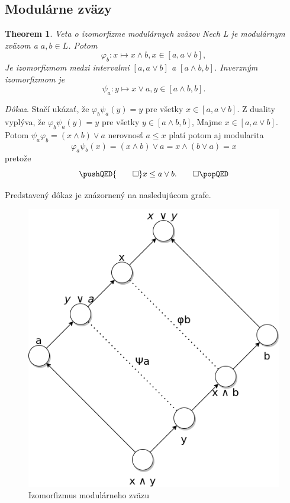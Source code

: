 \documentclass[a4paper,10pt,oneside]{report}%
\newtheorem{theorem}{Theorem}
\begin{document}
\subsection{Modulárne zväzy}
    \begin{theorem} \emph{Veta o izomorfizme modulárnych zväzov}
    Nech L je modulárnym zväzom a $a, b \in L$. Potom
        \begin{equation}
            \varphi_{b}: x \mapsto x \wedge b, x \in [a, a \vee b],
        \end{equation}
    Je izomorfizmom medzi intervalmi $[a, a \vee b]$ a $[ a \wedge b, b]$.
    Inverzným izomorfizmom je
        \begin{equation}
            \psi_{a}: y \mapsto x \vee a, y \in [a \wedge b, b].
        \end{equation}
    \end{theorem}
    \emph{Dôkaz}.  Stačí ukázať, že $\varphi_{b}\psi_{a}(y) = y$ pre všetky $x \in [a, a \vee b]$.
    Z duality vyplýva, že $\varphi_{b}\psi_{a}(y) = y$ pre všetky
        $y \in [a \wedge b, b]$,
    Majme $x \in [a, a \vee b]$. Potom
        $\psi_{a}\varphi_{b} = ( x \wedge b ) \vee a$ nerovnosť $a \leq x$ platí
        potom aj modularita
        \begin{equation}
            \varphi_{a}\psi_{b}(x) =
            ( x \wedge b ) \vee a =
            x \wedge ( b \vee a) =
            x
        \end{equation}
        pretože
        \[
            \pushQED{\qed}
            x \leq a \vee b. \qedhere
            \popQED
        \]

    Predstavený dôkaz je znázornený na nasledujúcom grafe.

\begin{figure}[!ht]
    \centering
    \includegraphics[scale=0.35]{modular_lattice_isomorphism.png}
    \caption{Izomorfizmus modulárneho zväzu}
\end{figure}
\end{document}
